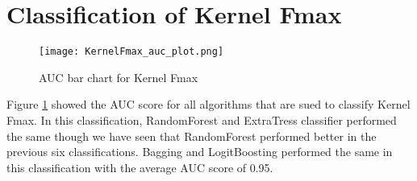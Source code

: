 \section{Classification of Kernel Fmax}

\begin{figure}[h!]
\centering
\texttt{[image: KernelFmax\_auc\_plot.png]}
\caption{AUC bar chart for Kernel Fmax}
\label{figure:kernelfmax_auc_plot}
\end{figure}

Figure \ref{figure:kernelfmax_auc_plot} showed the AUC score for all algorithms that are sued to classify Kernel Fmax. In this classification, RandomForest and ExtraTress classifier performed the same though we have seen that RandomForest performed better in the previous six classifications. Bagging and LogitBoosting performed the same in this classification with the average AUC score of 0.95.
